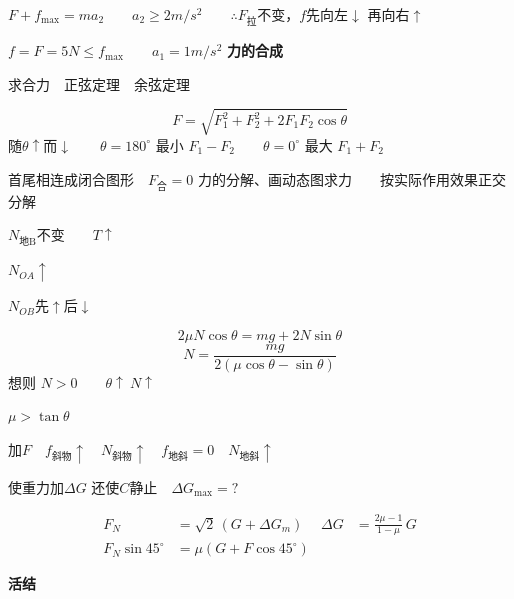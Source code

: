 $F+f_{\max}=ma_2$　　$a_2\ge 2\unit{m/s^2}$　　$\therefore F_{\text{拉}}$不变，$f$先向左$\downarrow$ 再向右$\uparrow$

$f=F=5\unit{N}\le f_{\max}$　　$a_1=1\unit{m/s^2}$
\textbf{力的合成}

求合力　正弦定理　余弦定理

\[
F=\sqrt{F_1^2+F_2^2+2F_1F_2\cos\theta}
\]
随$\theta\uparrow$而$\downarrow$　　$\theta=180^\circ$ 最小 $F_1-F_2$　　$\theta=0^\circ$ 最大 $F_1+F_2$


首尾相连成闭合图形　$F_{\text{合}}=0$
力的分解、画动态图求力　　按实际作用效果正交分解


$N_{\text{地B}}$不变　　$T\uparrow$


$N_{OA}\uparrow$

$N_{OB}$先$\uparrow$后$\downarrow$

\[
2\mu N\cos\theta=mg+2N\sin\theta
\]
\[
N=\frac{mg}{2(\mu\cos\theta-\sin\theta)}
\]
想则 $N>0$　　$\theta\uparrow\ N\uparrow$ %

$\mu>\tan\theta$

加$F$　$f_{\text{斜物}}\uparrow$　$N_{\text{斜物}}\uparrow$　$f_{\text{地斜}}=0$　$N_{\text{地斜}}\uparrow$
\begin{problem}
使重力加$\Delta G$ 还使$C$静止　$\Delta G_{\max}=?$ %


\begin{solution}
\begin{align*}
F_N&=\sqrt2\,(G+\Delta G_m) & \Delta G&=\frac{2\mu-1}{1-\mu}\,G\\
F_N\sin45^\circ&=\mu(G+F\cos45^\circ)
\end{align*}
\end{solution}
\end{problem}
\textbf{活结}


